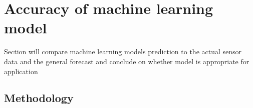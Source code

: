 \section{Accuracy of machine learning model}

Section will compare machine learning models prediction to the actual sensor
data and the general forecast and conclude on whether model is appropriate for
application

\subsection{Methodology}

